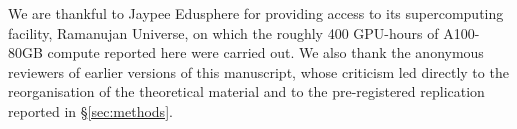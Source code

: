 %

We are thankful to Jaypee Edusphere for providing access to its
supercomputing facility, Ramanujan Universe, on which the roughly 400
GPU-hours of A100-80GB compute reported here were carried out. We also thank
the anonymous reviewers of earlier versions of this manuscript, whose
criticism led directly to the reorganisation of the theoretical material and
to the pre-registered replication reported in \S\ref{sec:methods}.
